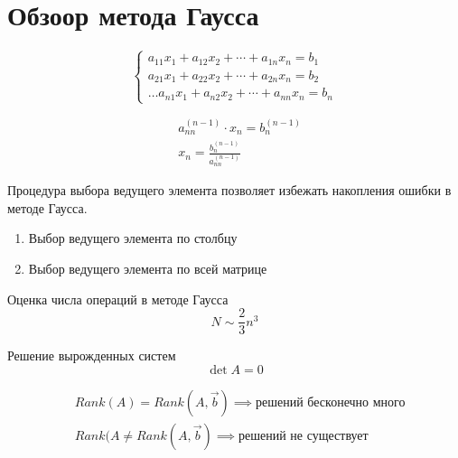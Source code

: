 \section{Обзоор метода Гаусса}
\[
\begin{cases}
  a_{11}x_1 + a_{12}x_2 + \cdots + a_{1n}x_n = b_1 \\
  a_{21}x_1 + a_{22}x_2 + \cdots + a_{2n}x_n = b_2 \\
  \dots
  a_{n1}x_1 + a_{n2}x_2 + \cdots + a_{nn}x_n = b_n
\end{cases}
\]

\begin{align*}
  &a_{nn}^{(n - 1)} \cdot x_n = b_n^{(n - 1)} \\
  &x_n = \frac{b_n^{(n - 1)}}{a_{nn}^{(n - 1)}}
\end{align*}

\begin{note}
  Процедура выбора ведущего элемента позволяет избежать накопления ошибки в
  методе Гаусса. \\
  \begin{enumerate}
  \item Выбор ведущего элемента по столбцу
  \item Выбор ведущего элемента по всей матрице
  \end{enumerate}
\end{note}

\begin{note}
  Оценка числа операций в методе Гаусса 
  \[
    N \sim \frac 23 n^3
  \]
\end{note}

\noindent
Решение вырожденных систем
\[
  \det{A} = 0
\]

\begin{note}
  \begin{align*}
    &Rank(A) = Rank(A, \vec{b}) \implies \text{решений бесконечно много} \\
    &Rank(A \neq Rank(A, \vec{b}) \implies \text{решений не существует}
  \end{align*}
\end{note}

